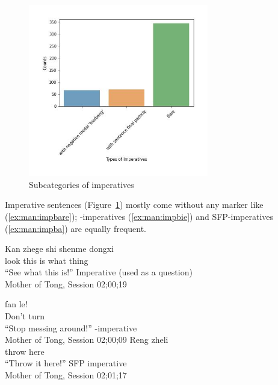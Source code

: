 \begin{figure}[H]
    \centering
    \includegraphics[width=0.7\textwidth]{figures/man-real-subimp.jpg}
    \caption{Subcategories of imperatives}
    \label{fig:man:real-subimp}
\end{figure}

Imperative sentences (Figure~\ref{fig:man:real-subimp}) mostly come without any marker like (\ref{ex:man:impbare}); -imperatives (\ref{ex:man:impbie}) and SFP-imperatives (\ref{ex:man:impba}) are equally frequent. 

\bxl\label{ex:man:impbare}
\gll Kan zhege shi shenme dongxi\\
look this is what thing\\
``See what this is!''  \hfill Imperative (used as a question)\\
Mother of Tong, Session 02;00;19

\ex \label{ex:man:impbie}
\gll {} fan le!\\
Don't turn \Asp{}\\
``Stop messing around!'' \hfill {}-imperative\\Mother of Tong, Session 02;00;09
\ex \label{ex:man:impba}
\gll Reng zheli \\
throw here \Sfp{}\\
\trans ``Throw it here!''
\hfill SFP imperative\\Mother of Tong, Session 02;01;17
\exl
\eex


